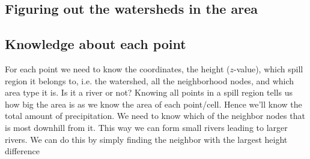 \documentclass[10pt,a4paper]{article}
\begin{document}
\subsection{Figuring out the watersheds in the area}

\subsection{Knowledge about each point}
For each point we need to know the coordinates, the height ($z$-value), which spill region it belongs to, i.e. the watershed, all the neighborhood nodes, and which area type it is. Is it a river or not? Knowing all points in a spill region tells us how big the area is as we know the area of each point/cell. Hence we'll know the total amount of precipitation. We need to know which of the neighbor nodes that is most downhill from it. This way we can form small rivers leading to larger rivers. We can do this by simply finding the neighbor with the largest height difference
\end{document}
